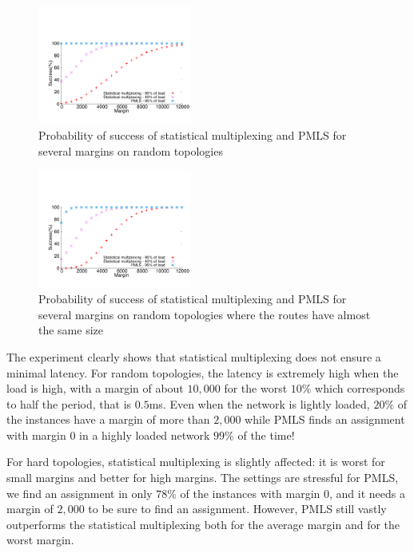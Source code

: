 \documentclass[10pt, conference, letterpaper]{IEEEtran}
\begin{document}
    \begin{figure}
       \begin{center}
      \includegraphics[width = 0.45\textwidth]{stochastic.pdf}
      \end{center}
      \caption{Probability of success of statistical multiplexing and PMLS for several margins on random topologies}
      \label{fig:sto}   
     \end{figure}    
     
         \begin{figure}
       \begin{center}
      \includegraphics[width = 0.45\textwidth]{stochasticbad.pdf}
      \end{center}
      \caption{Probability of success of statistical multiplexing and PMLS for several margins on random topologies where the routes have almost the same size}
      \label{fig:stobad}   
     \end{figure}    
     
     The experiment clearly shows that statistical multiplexing does not ensure a minimal latency. 
    For random topologies, the latency is extremely high when the load is high, with a margin of about $10,000$ for the worst $10\%$ which corresponds to half the period, that is $0.5$ms. Even when the network is lightly loaded, $20\%$ of the instances have a margin of more than $2,000$ while PMLS finds an assignment with margin $0$ in a highly loaded network $99\%$ of the time! 
    
    For hard topologies, statistical multiplexing is slightly affected: it is worst for small margins and better for high margins. The settings are stressful for PMLS, we find an assignment in only $78\%$ of the instances with margin $0$, and it needs a margin of $2,000$ to be sure to find an assignment. However, PMLS still vastly outperforms the statistical multiplexing both for the average margin and for the worst margin. 
    
\end{document}
